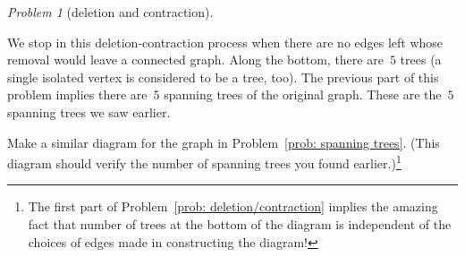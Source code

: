 \documentclass[11pt,twoside]{amsart}
\theoremstyle{plain}
\theoremstyle{remark}
\newtheorem{prob}{Problem}
\theoremstyle{definition}
\theoremstyle{definition}
\begin{document}
\begin{prob}[deletion and contraction]
\begin{enumerate}[(a)]
\begin{center}
      \end{center}
  \end{enumerate}
  \medskip

  We stop in this deletion-contraction process when there are no edges left
  whose removal would leave a connected graph.
  Along the bottom, there are~$5$ trees (a single isolated vertex is considered
  to be a tree, too).  The previous part of this problem implies there
  are~$5$ spanning trees of the original graph.  These are the~$5$ spanning
  trees we saw earlier.  
  
  Make a similar diagram for the graph in
  Problem~\ref{prob: spanning trees}.  (This diagram should verify the number of
  spanning trees you found earlier.)\footnote{The first part of
    Problem~\ref{prob: deletion/contraction} implies the amazing fact that
    number of trees at the bottom of the diagram is independent of the choices
    of edges made in constructing the diagram!}
\end{prob}
\end{document}
